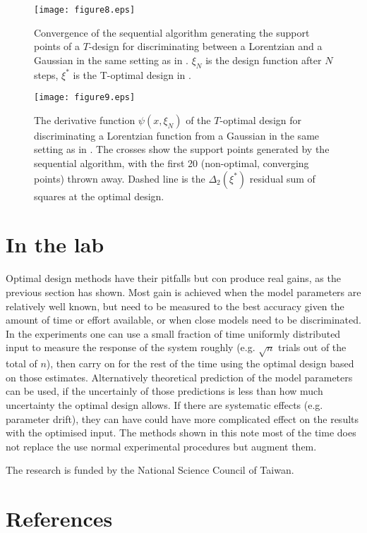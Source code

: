 \documentclass[12pt]{iopart}
\begin{document}
\begin{figure}
\texttt{[image: figure8.eps]}
\caption{Convergence of the sequential algorithm generating the support points of a $T$-design for discriminating between a Lorentzian and a Gaussian in the same setting as in . $\xi_N$ is the design function after $N$ steps, $\xi^*$ is the T-optimal design in .}
\label{fig:toptconvergence}
\end{figure}

\begin{figure}
\texttt{[image: figure9.eps]}
\caption{The derivative function $\psi(x, \xi_N)$ of the $T$-optimal design for discriminating a Lorentzian function from a Gaussian in the same setting as in . The crosses show the support points generated by the sequential algorithm, with the first 20 (non-optimal, converging points) thrown away. Dashed line is the $\Delta_2(\xi^*)$ residual sum of squares at the optimal design.}
\label{fig:topt}
\end{figure}



\section{In the lab}

Optimal design methods have their pitfalls but con produce real gains, as the previous section has shown.  Most gain is achieved when the model parameters are relatively well known, but need to be measured to the best accuracy given the amount of time or effort available, or when close models need to be discriminated. In the experiments one can use a small fraction of time uniformly distributed input to measure the response of the system roughly (e.g. $\sqrt{n}$ trials out of the total of $n$), then carry on for the rest of the time using the optimal design based on those estimates. Alternatively theoretical prediction of the model parameters can be used, if the uncertainly of those predictions is less than how much uncertainty the optimal design allows. If there are systematic effects (e.g. parameter drift), they can have could have more complicated effect on the results with the optimised input. The methods shown in this note most of the time does not replace the use normal experimental procedures but augment them.


\ack The research is funded by the National Science Council of Taiwan.



\section*{References}


\end{document}
